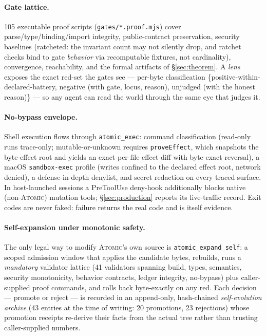\documentclass[11pt]{article}
\begin{document}
\paragraph{Gate lattice.} 105 executable proof scripts (\texttt{gates/*.proof.mjs})
cover parse/type/binding/import integrity, public-contract preservation, security
baselines (ratcheted: the invariant count may not silently drop, and ratchet
checks bind to gate \emph{behavior} via recomputable fixtures, not cardinality),
convergence, reachability, and the formal artifacts of \S\ref{sec:theorem}.
A \emph{lens} exposes the exact red-set the gates see --- per-byte
classification \{positive-within-declared-battery, negative (with gate, locus,
reason), unjudged (with the honest reason)\} --- so any agent can read the world
through the same eye that judges it.

\paragraph{No-bypass envelope.} Shell execution flows through
\texttt{atomic\_exec}: command classification (read-only runs trace-only;
mutable-or-unknown requires \texttt{proveEffect}, which snapshots the byte-effect
root and yields an exact per-file effect diff with byte-exact reversal), a macOS
\texttt{sandbox-exec} profile (writes confined to the declared effect root,
network denied), a defense-in-depth denylist, and secret redaction on every traced
surface. In host-launched sessions a PreToolUse deny-hook additionally blocks
native (non-\textsc{Atomic}) mutation tools; \S\ref{sec:production} reports its
live-traffic record. Exit codes are never faked: failure returns the real code
and is itself evidence.

\paragraph{Self-expansion under monotonic safety.} The only legal way to modify
\textsc{Atomic}'s own source is \texttt{atomic\_expand\_self}: a scoped admission
window that applies the candidate bytes, rebuilds, runs a \emph{mandatory}
validator lattice (41 validators spanning build, types, semantics, security
monotonicity, behavior contracts, ledger integrity, no-bypass) plus
caller-supplied proof commands, and rolls back byte-exactly on any red. Each
decision --- promote or reject --- is recorded in an append-only, hash-chained
\emph{self-evolution archive} (43 entries at the time of writing: 20 promotions,
23 rejections) whose promotion receipts re-derive their facts from the actual
tree rather than trusting caller-supplied numbers.
\end{document}
